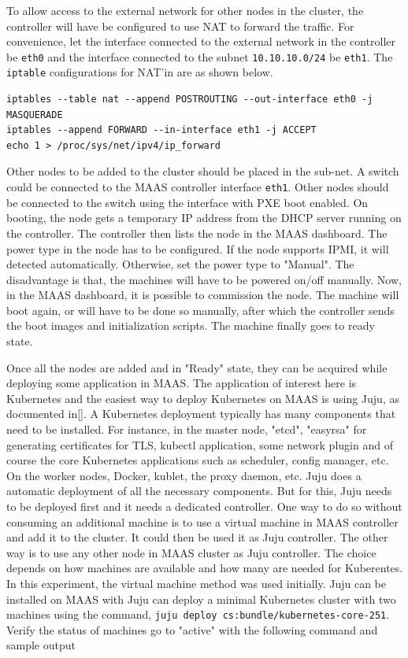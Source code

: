 \documentclass[english, 12pt, a4paper, elec, utf8, a-1b, online]{aaltothesis}
\begin{document}
To allow access to the external network for other nodes in the cluster, the controller will have be configured to use NAT to forward the traffic. For convenience, let the interface connected to the external network in the controller be \lstinline{eth0} and the interface connected to the subnet \lstinline{10.10.10.0/24} be \lstinline{eth1}. The \lstinline{iptable} configurations for NAT'in are as shown below.
\begin{lstlisting}[basicstyle={\small\ttfamily}]
iptables --table nat --append POSTROUTING --out-interface eth0 -j MASQUERADE
iptables --append FORWARD --in-interface eth1 -j ACCEPT
echo 1 > /proc/sys/net/ipv4/ip_forward
\end{lstlisting}

Other nodes to be added to the cluster should be placed in the sub-net. A switch could be connected to the MAAS controller interface \lstinline{eth1}. Other nodes should be connected to the switch using the interface with PXE boot enabled. On booting, the node gets a temporary IP address from the DHCP server running on the controller. The controller then lists the node in the MAAS dashboard. The power type in the node has to be configured. If the node supports IPMI, it will detected automatically. Otherwise, set the power type to "Manual". The disadvantage is that, the machines will have to be powered on/off manually. Now, in the MAAS dashboard, it is possible to commission the node. The machine will boot again, or will have to be done so manually, after which the controller sends the boot images and initialization scripts. The machine finally goes to ready state.

Once all the nodes are added and in "Ready" state, they can be acquired while deploying some application in MAAS. The application of interest here is Kubernetes and the easiest way to deploy Kubernetes on MAAS is using Juju, as documented in[]. A Kubernetes deployment typically has many components that need to be installed. For instance, in the master node, "etcd", "easyrsa" for generating certificates for TLS, kubectl application, some network plugin and of course the core Kubernetes applications such as scheduler, config manager, etc. On the worker nodes, Docker, kublet, the proxy daemon, etc. Juju does a automatic deployment of all the necessary components. But for this, Juju needs to be deployed first and it needs a dedicated controller. One way to do so without consuming an additional machine is to use a virtual machine in MAAS controller and add it to the cluster. It could then be used it as Juju controller. The other way is to  use any other node in MAAS cluster as Juju controller. The choice depends on how machines are available and how many are needed for Kuberentes. In this experiment, the virtual machine method was used initially. Juju can be installed on MAAS with Juju can deploy a minimal Kubernetes cluster with two machines using the command, \lstinline{juju deploy cs:bundle/kubernetes-core-251}. Verify the status of machines go to "active" with the following command and sample output
\end{document}
